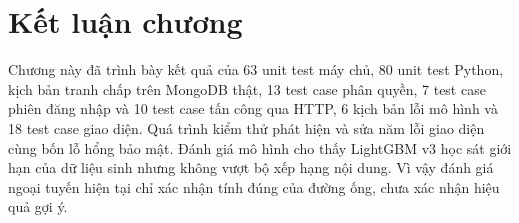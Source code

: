 \section{Kết luận chương}

Chương này đã trình bày kết quả của 63 unit test máy chủ, 80 unit test Python, kịch bản tranh chấp trên MongoDB thật, 13 test case phân quyền, 7 test case phiên đăng nhập và 10 test case tấn công qua HTTP, 6 kịch bản lỗi mô hình và 18 test case giao diện. Quá trình kiểm thử phát hiện và sửa năm lỗi giao diện cùng bốn lỗ hổng bảo mật. Đánh giá mô hình cho thấy LightGBM v3 học sát giới hạn của dữ liệu sinh nhưng không vượt bộ xếp hạng nội dung. Vì vậy đánh giá ngoại tuyến hiện tại chỉ xác nhận tính đúng của đường ống, chưa xác nhận hiệu quả gợi ý.
